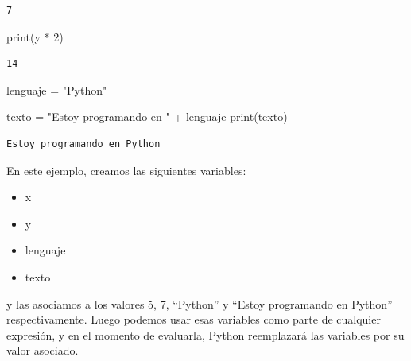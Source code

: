 \documentclass[
  letterpaper,
  DIV=11,
  numbers=noendperiod]{scrreprt}
\newenvironment{Shaded}{\begin{snugshade}}{\end{snugshade}}
\newcommand{\BuiltInTok}[1]{\textcolor[rgb]{0.00,0.23,0.31}{#1}}
\newcommand{\DecValTok}[1]{\textcolor[rgb]{0.68,0.00,0.00}{#1}}
\newcommand{\NormalTok}[1]{\textcolor[rgb]{0.00,0.23,0.31}{#1}}
\newcommand{\OperatorTok}[1]{\textcolor[rgb]{0.37,0.37,0.37}{#1}}
\newcommand{\StringTok}[1]{\textcolor[rgb]{0.13,0.47,0.30}{#1}}
\providecommand{\tightlist}{%
  \setlength{\itemsep}{0pt}\setlength{\parskip}{0pt}}\usepackage{longtable,booktabs,array}
\begin{document}
\begin{verbatim}
7
\end{verbatim}

\begin{Shaded}
\begin{Highlighting}[]
\BuiltInTok{print}\NormalTok{(y }\OperatorTok{*} \DecValTok{2}\NormalTok{)}
\end{Highlighting}
\end{Shaded}

\begin{verbatim}
14
\end{verbatim}

\begin{Shaded}
\begin{Highlighting}[]
\NormalTok{lenguaje }\OperatorTok{=} \StringTok{"Python"}

\NormalTok{texto }\OperatorTok{=} \StringTok{"Estoy programando en "} \OperatorTok{+}\NormalTok{ lenguaje}
\BuiltInTok{print}\NormalTok{(texto)}
\end{Highlighting}
\end{Shaded}

\begin{verbatim}
Estoy programando en Python
\end{verbatim}

En este ejemplo, creamos las siguientes variables:

\begin{itemize}
\tightlist
\item
  x
\item
  y
\item
  lenguaje
\item
  texto
\end{itemize}

y las asociamos a los valores 5, 7, ``Python'' y ``Estoy programando en
Python'' respectivamente. Luego podemos usar esas variables como parte
de cualquier expresión, y en el momento de evaluarla, Python reemplazará
las variables por su valor asociado.
\end{document}
